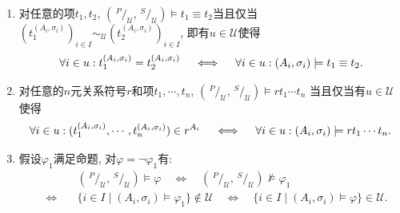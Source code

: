 \documentclass[UTF8]{ctexart}
\begin{document}
\begin{enumerate}
    \item 对任意的项$t_1,t_2$,
    $\left(\,^{\displaystyle P}\!/_{\displaystyle\mathcal{U}},\,^{\displaystyle S}
    \!/_{\displaystyle\mathcal{U}}\right)\models t_1\equiv t_2$当且仅当$(t_1^
    {(A_i,\sigma_i)})_{i\in I}\sim_{\mathcal{U}}(t_2^{(A_i,\sigma_i)})_{i\in I}$,
    即有$u\in\mathcal{U}$使得
    \vspace{3pt}
    \[
        \forall i\in u:t_1^{(A_i,\sigma_i)}=t_2^{(A_i,\sigma_i)}\quad\iff\quad
        \forall i\in u:(A_i,\sigma_i)\models t_1\equiv t_2.\\[3pt]
    \]

    \item 对任意的$n$元关系符号$r$和项$t_1,\cdots,t_n$,
    $\left(\,^{\displaystyle P}\!/_{\displaystyle\mathcal{U}},\,^{\displaystyle S}
    \!/_{\displaystyle\mathcal{U}}\right)\models rt_1\cdots t_n$
    当且仅当有$u\in\mathcal{U}$使得
    \vspace{3pt}
    \[
        \forall i\in u:(t_1^{(A_i,\sigma_i)},\cdots,t_n^{(A_i,\sigma_i)})\in r^{A_i}
        \quad\iff\quad\forall i\in u:(A_i,\sigma_i)\models rt_1\cdots t_n.\\[3pt]
    \]

    \item 假设$\varphi_1$满足命题, 对$\varphi=\neg\varphi_1$有:
    \vspace{5pt}
    \[\begin{aligned}
        &\left(\,^{\displaystyle P}\!/_{\displaystyle\mathcal{U}},\,
        ^{\displaystyle S}\!/_{\displaystyle\mathcal{U}}\right)\models\varphi
        \quad\iff\quad\left(\,^{\displaystyle P}\!/_{\displaystyle\mathcal{U}},\,
        ^{\displaystyle S}\!/_{\displaystyle\mathcal{U}}\right)\not\models\varphi_1\\
        \quad\iff\quad&\{i\in I\mid(A_i,\sigma_i)\models\varphi_1\}\notin\mathcal{U}
        \quad\iff\quad\{i\in I\mid(A_i,\sigma_i)\models\varphi\}\in\mathcal{U}.\\[3pt]
    \end{aligned}\]


\end{enumerate}
\end{document}
